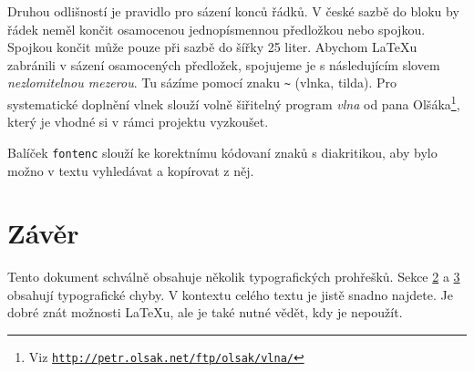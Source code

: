 \documentclass[10pt, a4paper, twocolumn]{article}
\begin{document}
Druhou odlišností je pravidlo pro sázení konců řádků.
V české sazbě do bloku by řádek neměl končit osamocenou jednopísmennou předložkou nebo spojkou.
Spojkou  končit může pouze při sazbě do šířky 25 liter.
Abychom \LaTeX u zabránili v sázení osamocených předložek, spojujeme je s následujícím slovem \emph{nezlomitelnou mezerou}.
Tu sázíme pomocí znaku \texttt{\~{}} (vlnka, tilda).
Pro systematické doplnění vlnek slouží volně šiřitelný program \emph{vlna} od pana Olšáka\footnote{Viz \texttt{\href{http://petr.olsak.net/ftp/olsak/vlna/} {http://petr.olsak.net/ftp/olsak/vlna/}}}, který je vhodné si v rámci projektu vyzkoušet.

Balíček \texttt{fontenc} slouží ke korektnímu kódovaní znaků s diakritikou, aby bylo možno v textu vyhledávat a kopírovat z něj.

\hypertarget{fifth}{\section{Závěr}}

Tento dokument schválně obsahuje několik typografických prohřešků.
Sekce \hyperlink{second}{2} a \hyperlink{third}{3} obsahují typografické chyby.
V kontextu celého textu je jistě snadno najdete.
Je dobré znát možnosti \LaTeX u, ale je také nutné vědět, kdy je nepoužít.
\end{document}

